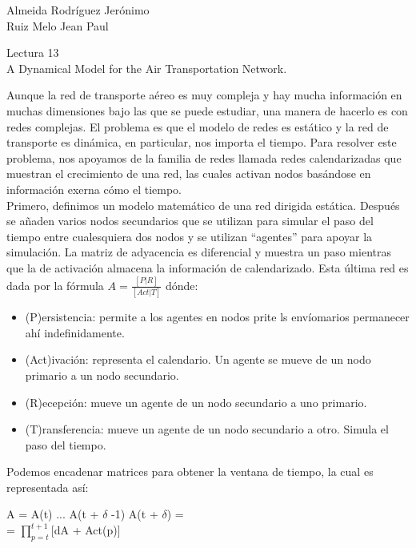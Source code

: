\documentclass[a4paper, 11pt]{report}
\begin{document}
\begin{flushright}
    Almeida Rodríguez Jerónimo\\
    Ruiz Melo Jean Paul
\end{flushright}

\begin{center}
    {\LARGE Lectura 13}\\
    {\LARGE A Dynamical Model for the Air Transportation Network.}
\end{center}

Aunque la red de transporte aéreo es muy compleja y hay mucha información en
muchas dimensiones bajo las que se puede estudiar, una manera de hacerlo es
con redes complejas. El problema es que el modelo de redes es estático y la red
de transporte es dinámica, en particular, nos importa el tiempo. Para
resolver este problema, nos apoyamos de la familia de redes llamada redes
calendarizadas que muestran el crecimiento de una red, las cuales
activan nodos basándose en información exerna cómo el tiempo.\\

Primero, definimos un modelo matemático de una red dirigida estática. Después se añaden varios nodos secundarios que se utilizan para
simular el paso del tiempo entre cualesquiera dos nodos y se utilizan
``agentes'' para apoyar la simulación. La matriz de adyacencia es diferencial y muestra un paso mientras que la de activación almacena la información de calendarizado. Esta última red es dada por la fórmula $A = \frac{[ P | R ]}{[Act | T]}$ dónde:
\begin{itemize}
    \item{(P)ersistencia: permite a los agentes en nodos prite ls envíomarios permanecer ahí
        indefinidamente.}
    \item{(Act)ivación: representa el calendario. Un agente se mueve de un nodo
        primario a un nodo secundario.}
    \item{(R)ecepción: mueve un agente de un nodo secundario a uno primario.}
    \item{(T)ransferencia: mueve un agente de un nodo secundario a otro. Simula
        el paso del tiempo.}
\end{itemize}

Podemos encadenar matrices para obtener la ventana de tiempo, la cual es representada así:
\begin{center}
    A = A(t) ... A(t + $\delta$ -1) A(t + $\delta$) = \\
    = $\prod^{t+1}_{p=t}$[dA + Act(p)]
\end{center}
\end{document}
